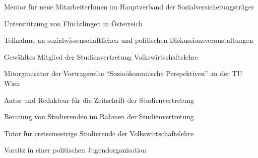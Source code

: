 

	{\begin{cvenumerate}
		\item Mentor für neue MitarbeiterInnen im Hauptverband der Sozialversicherungsträger
		\item Unterstützung von Flüchtlingen in Österreich
		\item Teilnahme an sozialwissenschaftlichen und politischen Diskussionsveranstaltungen
	\end{cvenumerate}}

{\begin{cvenumerate}
		\item Gewähltes Mitglied der Studienvertretung Volkswirtschaftslehre
		\item Mitorganisator der Vortragsreihe "`Sozioökonomische Perspektiven"' an der TU Wien
		\item Autor und Redakteur für die Zeitschrift der Studienvertretung
		\item Beratung von Studierenden im Rahmen der Studienvertretung
		\item Tutor für erstsemestrige Studierende der Volkswirtschaftslehre
		\item Vorsitz in einer politischen Jugendorganisation
	\end{cvenumerate}}